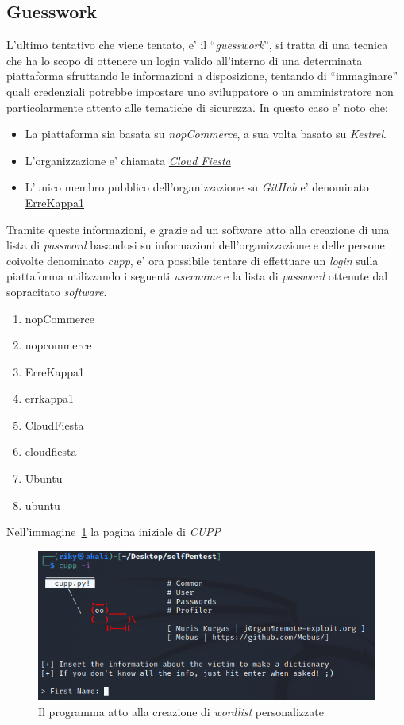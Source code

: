 \documentclass[a4paper]{report}
\newcommand{\quotes}[1]{``#1''}
\begin{document}
			\subsection{Guesswork}\label{guesswork}
				L'ultimo tentativo che viene tentato, e' il \quotes{\emph{guesswork}}, si tratta di una tecnica che ha
				lo scopo di ottenere un login valido all'interno di una determinata piattaforma sfruttando le
				informazioni a disposizione, tentando di \quotes{immaginare} quali credenziali potrebbe impostare uno
				sviluppatore o un amministratore non particolarmente attento alle tematiche di sicurezza.
				In questo caso e' noto che:
				\begin{itemize}
					\item La piattaforma sia basata su \emph{nopCommerce}, a sua volta basato su \emph{Kestrel}.
					\item L'organizzazione e' chiamata \href{https://github.com/Cloud-Fiesta}{\emph{Cloud Fiesta}}
					\item L'unico membro pubblico dell'organizzazione su \emph{GitHub} e' denominato \href{https://github.com/ErreKappa1}{ErreKappa1}
				\end{itemize}
				Tramite queste informazioni, e grazie ad un software atto alla creazione di una lista di \emph{password}
				basandosi su informazioni dell'organizzazione e delle persone coivolte denominato \emph{cupp}, e' ora
				possibile tentare di effettuare un \emph{login} sulla piattaforma utilizzando i seguenti \emph{username}
				e la lista di \emph{password} ottenute dal sopracitato \emph{software}.
				\begin{enumerate}
					\item nopCommerce
					\item nopcommerce
					\item ErreKappa1
					\item errkappa1
					\item CloudFiesta
					\item cloudfiesta
					\item Ubuntu
					\item ubuntu
				\end{enumerate}
				Nell'immagine~\ref{fig:cupp} la pagina iniziale di \emph{CUPP}
				\begin{figure}[H]
					\includegraphics[width=\textwidth]{CUPP.png}
					\caption{Il programma atto alla creazione di \emph{wordlist} personalizzate}\label{fig:cupp}
				\end{figure}
\end{document}
